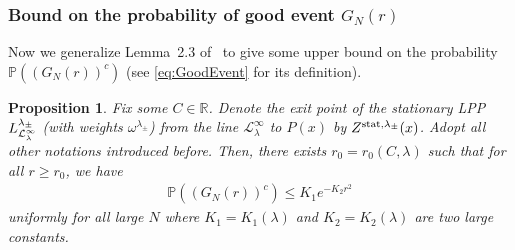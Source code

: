 \documentclass[12pt,a4paper]{article}
\numberwithin{equation}{section}
\newcommand{\Pb}{\mathbb{P}}
\newtheorem{prop}{Proposition}[section]
\begin{document}
\subsubsection{Bound on the probability of good event $G_N(r)$}
Now we generalize Lemma~2.3 of~\cite{Pi17} to give some upper bound on the probability $\Pb((G_{N}(r))^c)$ (see \eqref{eq:GoodEvent} for its definition).
\begin{prop}\label{CrucialEventIdentification}
Fix some $C\in \mathbb{R}$. Denote the exit point of the stationary LPP $L^{\lambda_{\pm}}_{{\cal L}_{\lambda}^{\infty}}$ (with weights $\omega^{\lambda_{\pm}}$) from the line $\mathcal{L}^{\infty}_{\lambda}$ to $P(x)$ by $Z^{{\rm stat},\lambda_{\pm}}(x)$. Adopt all other notations introduced before. Then, there exists $r_0=r_0(C,\lambda)$ such that for all $r\geq r_0$, we have
\begin{align}\label{eq:EventGoesToZero}
\Pb\left( \left(G_{N}(r)\right)^c \right) \leq K_1e^{-K_2r^2}
\end{align}
uniformly for all large $N$ where $K_1=K_1(\lambda)$ and $K_2=K_2(\lambda)$ are two large constants.
\end{prop}
\end{document}
